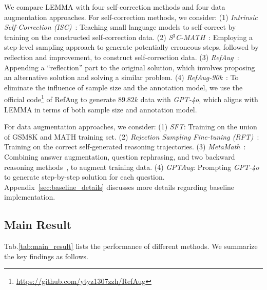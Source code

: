 \documentclass[11pt]{article}
\begin{document}
We compare LEMMA with four self-correction methods and four data augmentation approaches. For self-correction methods, we consider:
(1) \textit{Intrinsic Self-Correction (ISC)}~\cite{han2024small}: Teaching small language models to self-correct by training on the constructed self-correction data. 
(2) \textit{S$^3$C-MATH}~\cite{yan2024s}: Employing a step-level sampling approach to generate potentially erroneous steps, followed by reflection and improvement, to construct self-correction data.
(3) \textit{RefAug}~\cite{zhang-etal-2024-learn}: Appending a ``reflection'' part to the original solution, which involves proposing an alternative solution and solving a similar problem. 
(4) \textit{RefAug-90k}~\cite{zhang-etal-2024-learn}: To eliminate the influence of sample size and the annotation model, we use the official code\footnote{\url{https://github.com/ytyz1307zzh/RefAug}} of RefAug to generate $89.82k$ data with \textit{GPT-4o}, which aligns with LEMMA in terms of both sample size and annotation model.

For data augmentation approaches, we consider:
(1) \textit{SFT}: Training on the union of GSM8K and MATH training set.
(2) \textit{Rejection Sampling Fine-tuning (RFT)}~\cite{yuan2023scaling}: Training on the correct self-generated reasoning trajectories. 
(3) \textit{MetaMath}~\cite{yumetamath}: Combining answer augmentation, question rephrasing, and two backward reasoning methods~\cite{jiang2024forward,weng-etal-2023-large}, to augment training data.
(4) \textit{GPTAug}: Prompting \textit{GPT-4o} to generate step-by-step solution for each question. 
Appendix~\ref{sec:baseline_details} discusses more details regarding baseline implementation.

\subsection{Main Result}

Tab.\ref{tab:main_result} lists the performance of different methods. We summarize the key findings as follows.
\end{document}
